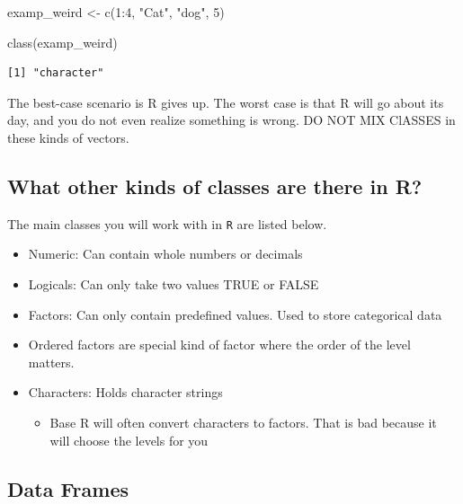 \documentclass[
  letterpaper,
  DIV=11,
  numbers=noendperiod,
  oneside]{scrreprt}
\newenvironment{Shaded}{\begin{snugshade}}{\end{snugshade}}
\newcommand{\DecValTok}[1]{\textcolor[rgb]{0.68,0.00,0.00}{#1}}
\newcommand{\FunctionTok}[1]{\textcolor[rgb]{0.28,0.35,0.67}{#1}}
\newcommand{\NormalTok}[1]{\textcolor[rgb]{0.00,0.23,0.31}{#1}}
\newcommand{\OtherTok}[1]{\textcolor[rgb]{0.00,0.23,0.31}{#1}}
\newcommand{\SpecialCharTok}[1]{\textcolor[rgb]{0.37,0.37,0.37}{#1}}
\newcommand{\StringTok}[1]{\textcolor[rgb]{0.13,0.47,0.30}{#1}}
\providecommand{\tightlist}{%
  \setlength{\itemsep}{0pt}\setlength{\parskip}{0pt}}\usepackage{longtable,booktabs,array}
\begin{document}
\begin{Shaded}
\begin{Highlighting}[]
\NormalTok{examp\_weird }\OtherTok{\textless{}{-}} \FunctionTok{c}\NormalTok{(}\DecValTok{1}\SpecialCharTok{:}\DecValTok{4}\NormalTok{, }\StringTok{"Cat"}\NormalTok{, }\StringTok{"dog"}\NormalTok{, }\DecValTok{5}\NormalTok{)}

\FunctionTok{class}\NormalTok{(examp\_weird)}
\end{Highlighting}
\end{Shaded}

\begin{verbatim}
[1] "character"
\end{verbatim}

The best-case scenario is R gives up. The worst case is that R will go
about its day, and you do not even realize something is wrong. DO NOT
MIX ClASSES in these kinds of vectors.

\hypertarget{what-other-kinds-of-classes-are-there-in-r}{%
\subsection{What other kinds of classes are there in
R?}\label{what-other-kinds-of-classes-are-there-in-r}}

The main classes you will work with in \texttt{R} are listed below.

\begin{itemize}
\tightlist
\item
  Numeric: Can contain whole numbers or decimals
\item
  Logicals: Can only take two values TRUE or FALSE
\item
  Factors: Can only contain predefined values. Used to store categorical
  data
\item
  Ordered factors are special kind of factor where the order of the
  level matters.
\item
  Characters: Holds character strings

  \begin{itemize}
  \tightlist
  \item
    Base R will often convert characters to factors. That is bad because
    it will choose the levels for you
  \end{itemize}
\end{itemize}

\hypertarget{data-frames}{%
\subsection{Data Frames}\label{data-frames}}
\end{document}
